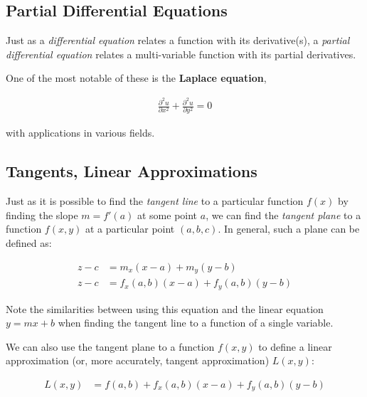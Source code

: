 \documentclass[12pt]{article}
\begin{document}
\subsection{Partial Differential Equations}

Just as a \textit{differential equation} relates a function with its derivative(s), a \textit{partial differential equation} relates a multi-variable function with its partial derivatives. 

One of the most notable of these is the \textbf{Laplace equation},

\begin{equation}
    \begin{split}
        \frac{\partial^2u}{\partial x^2} + \frac{\partial^2u}{\partial y^2} = 0
    \end{split}
\end{equation}

with applications in various fields. 

\subsection{Tangents, Linear Approximations}

Just as it is possible to find the \textit{tangent line} to a particular function $f(x)$ by finding the slope $m=f'(a)$ at some point $a$, we can find the \textit{tangent plane} to a function $f(x,y)$ at a particular point $(a,b,c)$. In general, such a plane can be defined as:

\begin{equation}
    \begin{split}
        z - c &= m_x(x-a) + m_y(y-b)\\
        z - c &= f_x(a,b)(x-a) + f_y(a,b)(y-b)
    \end{split}
\end{equation}

Note the similarities between using this equation and the linear equation $y=mx+b$ when finding the tangent line to a function of a single variable.

We can also use the tangent plane to a function $f(x,y)$ to define a linear approximation (or, more accurately, tangent approximation) $L(x,y)$:

\begin{equation}
    \begin{split}
        L(x,y) &= f(a,b) + f_x(a,b)(x-a) + f_y(a,b)(y-b)\\
    \end{split}
\end{equation}
\end{document}
